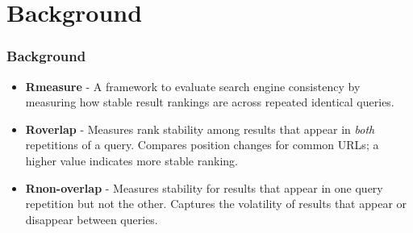 \section{Background}
\begin{frame}
\frametitle{Background}

\begin{itemize}
    \item \textbf{Rmeasure} - A framework to evaluate search engine consistency by measuring how stable result rankings are across repeated identical queries.

    \item \textbf{Roverlap} - Measures rank stability among results that appear in \emph{both} repetitions of a query. Compares position changes for common URLs; a higher value indicates more stable ranking.

    \item \textbf{Rnon-overlap} - Measures stability for results that appear in one query repetition but not the other. Captures the volatility of results that appear or disappear between queries.

\end{itemize}

\end{frame}
